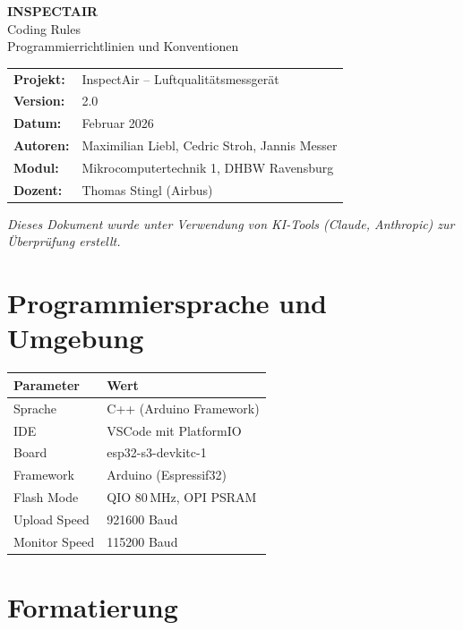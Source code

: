 \documentclass[a4paper,11pt]{article}
\begin{document}
\begin{center}
{\LARGE\textbf{INSPECTAIR}}\\[0.3cm]
{\Large Coding Rules}\\[0.3cm]
{\large Programmierrichtlinien und Konventionen}\\[0.5cm]
\begin{tabular}{ll}
\textbf{Projekt:} & InspectAir -- Luftqualitätsmessgerät \\
\textbf{Version:} & 2.0 \\
\textbf{Datum:} & Februar 2026 \\
\textbf{Autoren:} & Maximilian Liebl, Cedric Stroh, Jannis Messer \\
\textbf{Modul:} & Mikrocomputertechnik 1, DHBW Ravensburg \\
\textbf{Dozent:} & Thomas Stingl (Airbus) \\
\end{tabular}
\end{center}

\vspace{0.5cm}
\noindent\textit{Dieses Dokument wurde unter Verwendung von KI-Tools (Claude, Anthropic) zur Überprüfung erstellt.}
\vspace{0.3cm}

\tableofcontents
\newpage

\section{Programmiersprache und Umgebung}

\begin{tabularx}{\textwidth}{lX}
\toprule
\rowcolor{tableheader}
\textbf{Parameter} & \textbf{Wert} \\
\midrule
Sprache & C++ (Arduino Framework) \\
IDE & VSCode mit PlatformIO \\
Board & esp32-s3-devkitc-1 \\
Framework & Arduino (Espressif32) \\
Flash Mode & QIO 80\,MHz, OPI PSRAM \\
Upload Speed & 921600 Baud \\
Monitor Speed & 115200 Baud \\
\bottomrule
\end{tabularx}

\section{Formatierung}
\end{document}
